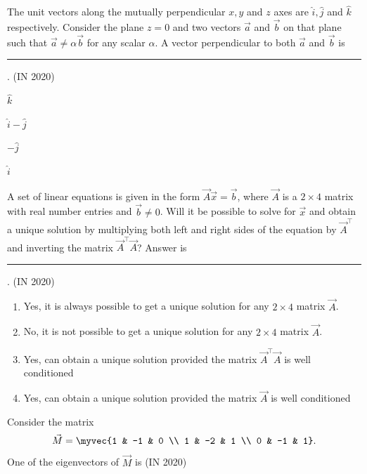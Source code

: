 \item The unit vectors along the mutually perpendicular $x, y$ and $z$ axes are $\hat{i}, \hat{j}$ and $\hat{k}$ respectively. Consider the plane $z = 0$ and two vectors $\vec{a}$ and $\vec{b}$ on that plane such that $\vec{a} \neq \alpha \vec{b}$ for any scalar $\alpha$. A vector perpendicular to both $\vec{a}$ and $\vec{b}$ is \rule{1cm}{0.01pt}.
\hfill{(IN 2020)}
\begin{enumerate}
\begin{multicols}{4}
\item $\hat{k}$
\item $\hat{i} - \hat{j}$
\item $-\hat{j}$
\item $\hat{i}$
\end{multicols}
\end{enumerate}
\item A set of linear equations is given in the form $\vec{A}\vec{x} = \vec{b}$, where $\vec{A}$ is a $2 \times 4$ matrix with real number entries and $\vec{b} \neq 0$. Will it be possible to solve for $\vec{x}$ and obtain a unique solution by multiplying both left and right sides of the equation by $\vec{A}^{\top}$  and inverting the matrix $\vec{A}^{\top} \vec{A}$? Answer is \rule{1cm}{0.01pt}.
\hfill{(IN 2020)}
\begin{enumerate}
\item Yes, it is always possible to get a unique solution for any $2 \times 4$ matrix $\vec{A}$.
\item No, it is not possible to get a unique solution for any $2 \times 4$ matrix $\vec{A}$.
\item Yes, can obtain a unique solution provided the matrix $\vec{A}^{\top} \vec{A}$ is well conditioned
\item Yes, can obtain a unique solution provided the matrix $\vec{A}$ is well conditioned
\end{enumerate}
\item Consider the matrix 
\begin{align*}
\vec{M} = \myvec{1 & -1 & 0 \\ 1 & -2 & 1 \\ 0 & -1 & 1}.
\end{align*}
 One of the eigenvectors of $\vec{M}$ is
\hfill{(IN 2020)}
\begin{enumerate}
\begin{multicols}{4}
\item
{}
\item 
{}
\item
{}
\item
{}
\end{multicols}
\end{enumerate}
